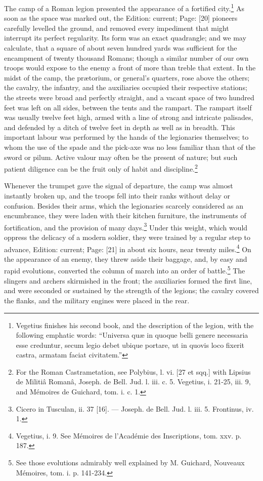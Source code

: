 The camp of a Roman legion presented the appearance of a fortified city.\footnote{Vegetius finishes his second book, and the description of the legion, with the following emphatic words: \texthebrew{“}Universa quæ in quoque belli genere necessaria esse creduntur, secum legio debet ubique portare, ut in quovis loco fixerit castra, armatam faciat civitatem.\texthebrew{}”} As soon as the space was marked out, the Edition: current; Page: [20] pioneers carefully levelled the ground, and removed every impediment that might interrupt its perfect regularity. Its form was an exact quadrangle; and we may calculate, that a square of about seven hundred yards was sufficient for the encampment of twenty thousand Romans; though a similar number of our own troops would expose to the enemy a front of more than treble that extent. In the midst of the camp, the prætorium, or general\texthebrew{}’s quarters, rose above the others; the cavalry, the infantry, and the auxiliaries occupied their respective stations; the streets were broad and perfectly straight, and a vacant space of two hundred feet was left on all sides, between the tents and the rampart. The rampart itself was usually twelve feet high, armed with a line of strong and intricate palisades, and defended by a ditch of twelve feet in depth as well as in breadth. This important labour was performed by the hands of the legionaries themselves; to whom the use of the spade and the pick-axe was no less familiar than that of the sword or pilum. Active valour may often be the present of nature; but such patient diligence can be the fruit only of habit and discipline.\footnote{For the Roman Castrametation, see Polybius, l. vi. [27 et sqq.] with Lipsius de Militiâ Romanâ, Joseph. de Bell. Jud. l. iii. c. 5. Vegetius, i. 21-25, iii. 9, and Mémoires de Guichard, tom. i. c. 1.}

Whenever the trumpet gave the signal of departure, the camp was almost instantly broken up, and the troops fell into their ranks without delay or confusion. Besides their arms, which the legionaries scarcely considered as an encumbrance, they were laden with their kitchen furniture, the instruments of fortification, and the provision of many days.\footnote{Cicero in Tusculan, ii. 37 [16]. \texthebrew{—} Joseph. de Bell. Jud. l. iii. 5. Frontinus, iv. 1.} Under this weight, which would oppress the delicacy of a modern soldier, they were trained by a regular step to advance, Edition: current; Page: [21] in about six hours, near twenty miles.\footnote{Vegetius, i. 9. See Mémoires de l\texthebrew{}’Académie des Inscriptions, tom. xxv. p. 187.} On the appearance of an enemy, they threw aside their baggage, and, by easy and rapid evolutions, converted the column of march into an order of battle.\footnote{See those evolutions admirably well explained by M. Guichard, Nouveaux Mémoires, tom. i. p. 141-234.} The slingers and archers skirmished in the front; the auxiliaries formed the first line, and were seconded or sustained by the strength of the legions; the cavalry covered the flanks, and the military engines were placed in the rear.

